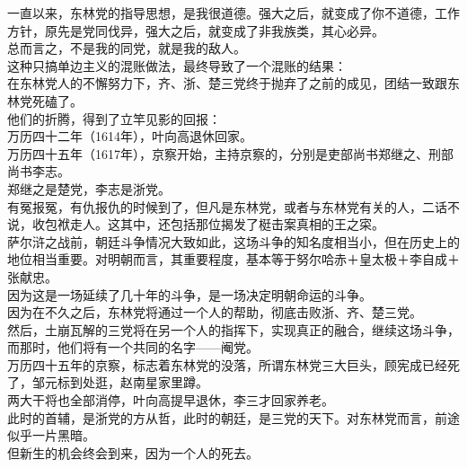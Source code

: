 \begin{multicols}{\theparacolNo}
一直以来，东林党的指导思想，是我很道德。强大之后，就变成了你不道德，工作方针，原先是党同伐异，强大之后，就变成了非我族类，其心必异。\\

总而言之，不是我的同党，就是我的敌人。\\

这种只搞单边主义的混账做法，最终导致了一个混账的结果：\\

在东林党人的不懈努力下，齐、浙、楚三党终于抛弃了之前的成见，团结一致跟东林党死磕了。\\

他们的折腾，得到了立竿见影的回报：\\

万历四十二年（1614年），叶向高退休回家。\\

万历四十五年（1617年），京察开始，主持京察的，分别是吏部尚书郑继之、刑部尚书李志。\\

郑继之是楚党，李志是浙党。\\

有冤报冤，有仇报仇的时候到了，但凡是东林党，或者与东林党有关的人，二话不说，收包袱走人。这其中，还包括那位揭发了梃击案真相的王之寀。\\

萨尔浒之战前，朝廷斗争情况大致如此，这场斗争的知名度相当小，但在历史上的地位相当重要。对明朝而言，其重要程度，基本等于努尔哈赤＋皇太极＋李自成＋张献忠。\\

因为这是一场延续了几十年的斗争，是一场决定明朝命运的斗争。\\

因为在不久之后，东林党将通过一个人的帮助，彻底击败浙、齐、楚三党。\\

然后，土崩瓦解的三党将在另一个人的指挥下，实现真正的融合，继续这场斗争，而那时，他们将有一个共同的名字——阉党。\\

万历四十五年的京察，标志着东林党的没落，所谓东林党三大巨头，顾宪成已经死了，邹元标到处逛，赵南星家里蹲。\\

两大干将也全部消停，叶向高提早退休，李三才回家养老。\\

此时的首辅，是浙党的方从哲，此时的朝廷，是三党的天下。对东林党而言，前途似乎一片黑暗。\\

但新生的机会终会到来，因为一个人的死去。\\


\end{multicols}
